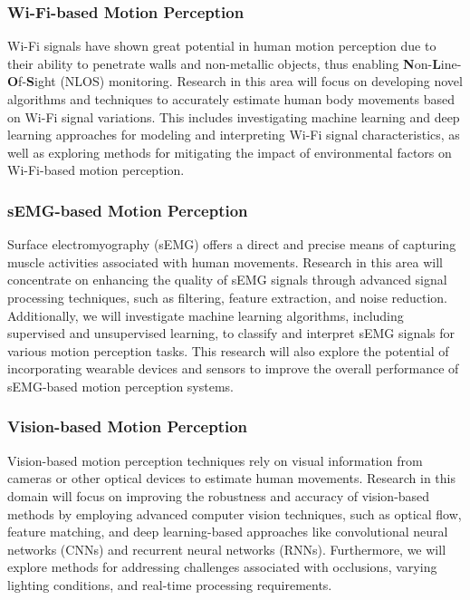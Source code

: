 \documentclass[12pt, a4paper]{article}
\begin{document}
\subsubsection{Wi-Fi-based Motion Perception}

Wi-Fi signals have shown great potential in human motion perception due to their ability to penetrate walls and non-metallic objects, thus enabling \textbf{N}on-\textbf{L}ine-\textbf{O}f-\textbf{S}ight (NLOS) monitoring. Research in this area will focus on developing novel algorithms and techniques to accurately estimate human body movements based on Wi-Fi signal variations. This includes investigating machine learning and deep learning approaches for modeling and interpreting Wi-Fi signal characteristics, as well as exploring methods for mitigating the impact of environmental factors on Wi-Fi-based motion perception.

\subsubsection{sEMG-based Motion Perception}

Surface electromyography (sEMG) offers a direct and precise means of capturing muscle activities associated with human movements. Research in this area will concentrate on enhancing the quality of sEMG signals through advanced signal processing techniques, such as filtering, feature extraction, and noise reduction. Additionally, we will investigate machine learning algorithms, including supervised and unsupervised learning, to classify and interpret sEMG signals for various motion perception tasks. This research will also explore the potential of incorporating wearable devices and sensors to improve the overall performance of sEMG-based motion perception systems.

\subsubsection{Vision-based Motion Perception}

Vision-based motion perception techniques rely on visual information from cameras or other optical devices to estimate human movements. Research in this domain will focus on improving the robustness and accuracy of vision-based methods by employing advanced computer vision techniques, such as optical flow, feature matching, and deep learning-based approaches like convolutional neural networks (CNNs) and recurrent neural networks (RNNs). Furthermore, we will explore methods for addressing challenges associated with occlusions, varying lighting conditions, and real-time processing requirements.
\end{document}
